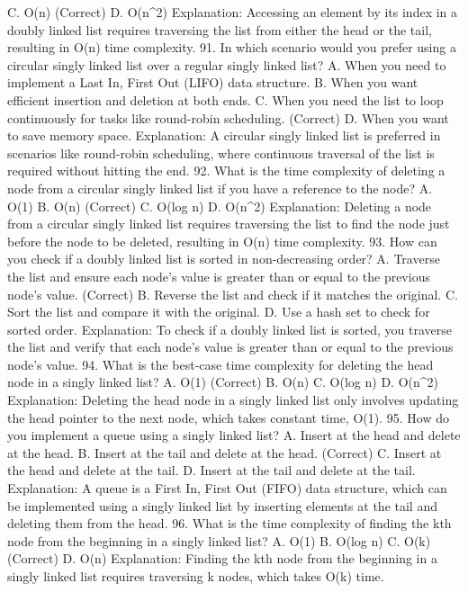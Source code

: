 C. O(n) (Correct)
D. O(n^2)
Explanation: Accessing an element by its index in a doubly linked list requires traversing the list from either the head or the tail, resulting in O(n) time complexity.
91. In which scenario would you prefer using a circular singly linked list over a regular singly linked list?
A. When you need to implement a Last In, First Out (LIFO) data structure.
B. When you want efficient insertion and deletion at both ends.
C. When you need the list to loop continuously for tasks like round-robin scheduling. (Correct)
D. When you want to save memory space.
Explanation: A circular singly linked list is preferred in scenarios like round-robin scheduling, where continuous traversal of the list is required without hitting the end.
92. What is the time complexity of deleting a node from a circular singly linked list if you have a reference to the node?
A. O(1)
B. O(n) (Correct)
C. O(log n)
D. O(n^2)
Explanation: Deleting a node from a circular singly linked list requires traversing the list to find the node just before the node to be deleted, resulting in O(n) time complexity.
93. How can you check if a doubly linked list is sorted in non-decreasing order?
A. Traverse the list and ensure each node's value is greater than or equal to the previous node's value. (Correct)
B. Reverse the list and check if it matches the original.
C. Sort the list and compare it with the original.
D. Use a hash set to check for sorted order.
Explanation: To check if a doubly linked list is sorted, you traverse the list and verify that each node’s value is greater than or equal to the previous node’s value.
94. What is the best-case time complexity for deleting the head node in a singly linked list?
A. O(1) (Correct)
B. O(n)
C. O(log n)
D. O(n^2)
Explanation: Deleting the head node in a singly linked list only involves updating the head pointer to the next node, which takes constant time, O(1).
95. How do you implement a queue using a singly linked list?
A. Insert at the head and delete at the head.
B. Insert at the tail and delete at the head. (Correct)
C. Insert at the head and delete at the tail.
D. Insert at the tail and delete at the tail.
Explanation: A queue is a First In, First Out (FIFO) data structure, which can be implemented using a singly linked list by inserting elements at the tail and deleting them from the head.
96. What is the time complexity of finding the kth node from the beginning in a singly linked list?
A. O(1)
B. O(log n)
C. O(k) (Correct)
D. O(n)
Explanation: Finding the kth node from the beginning in a singly linked list requires traversing k nodes, which takes O(k) time.
